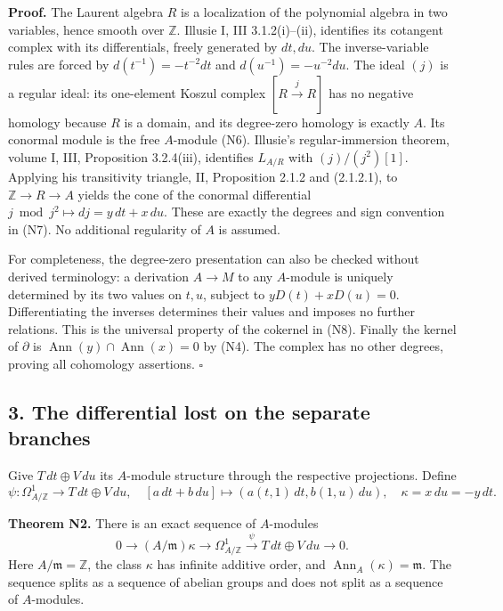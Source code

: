 \documentclass[
]{article}
\begin{document}
\textbf{Proof.} The Laurent algebra \(R\) is a localization of the
polynomial algebra in two variables, hence smooth over \(\mathbb Z\).
Illusie I, III 3.1.2(i)--(ii), identifies its cotangent complex with its
differentials, freely generated by \(dt,du\). The inverse-variable rules
are forced by \(d(t^{-1})=-t^{-2}dt\) and \(d(u^{-1})=-u^{-2}du\). The
ideal \((j)\) is a regular ideal: its one-element Koszul complex
\([R\xrightarrow{j}R]\) has no negative homology because \(R\) is a
domain, and its degree-zero homology is exactly \(A\). Its conormal
module is the free \(A\)-module (N6). Illusie's regular-immersion
theorem, volume I, III, Proposition 3.2.4(iii), identifies \(L_{A/R}\)
with \((j)/(j^2)[1]\). Applying his transitivity triangle, II,
Proposition 2.1.2 and (2.1.2.1), to \(\mathbb Z\to R\to A\) yields the
cone of the conormal differential \(j\bmod j^2\mapsto dj=y\,dt+x\,du\).
These are exactly the degrees and sign convention in (N7). No additional
regularity of \(A\) is assumed.

For completeness, the degree-zero presentation can also be checked
without derived terminology: a derivation \(A\to M\) to any \(A\)-module
is uniquely determined by its two values on \(t,u\), subject to
\(yD(t)+xD(u)=0\). Differentiating the inverses determines their values
and imposes no further relations. This is the universal property of the
cokernel in (N8). Finally the kernel of \(\partial\) is
\(\operatorname{Ann}(y)\cap\operatorname{Ann}(x)=0\) by (N4). The
complex has no other degrees, proving all cohomology assertions.
\(\square\)

\subsection{3. The differential lost on the separate
branches}\label{the-differential-lost-on-the-separate-branches}

Give \(T\,dt\oplus V\,du\) its \(A\)-module structure through the
respective projections. Define \[
\psi:\Omega^1_{A/\mathbb Z}\longrightarrow T\,dt\oplus V\,du,
\quad [a\,dt+b\,du]\longmapsto(a(t,1)\,dt,b(1,u)\,du),
\quad\kappa=x\,du=-y\,dt.
\tag{N9}
\]

\textbf{Theorem N2.} There is an exact sequence of \(A\)-modules \[
0\longrightarrow(A/\mathfrak m)\kappa
\longrightarrow\Omega^1_{A/\mathbb Z}
\xrightarrow{\psi}T\,dt\oplus V\,du\longrightarrow0.
\tag{N10}
\] Here \(A/\mathfrak m=\mathbb Z\), the class \(\kappa\) has infinite
additive order, and \(\operatorname{Ann}_A(\kappa)=\mathfrak m\). The
sequence splits as a sequence of abelian groups and does not split as a
sequence of \(A\)-modules.
\end{document}
